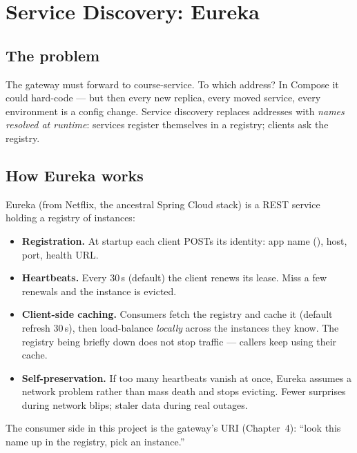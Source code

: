 \chapter{Service Discovery: Eureka}
\label{ch:eureka}

\section{The problem}

The gateway must forward  to course-service. To which
address? In Compose it could hard-code  ---
but then every new replica, every moved service, every environment is a
config change. Service discovery replaces addresses with \emph{names
resolved at runtime}: services register themselves in a registry; clients
ask the registry.

\section{How Eureka works}

Eureka (from Netflix, the ancestral Spring Cloud stack) is a REST service
holding a registry of instances:

\begin{itemize}
  \item \textbf{Registration.} At startup each client POSTs its identity:
  app name (), host, port, health URL.
  \item \textbf{Heartbeats.} Every 30\,s (default) the client renews its
  lease. Miss a few renewals and the instance is evicted.
  \item \textbf{Client-side caching.} Consumers fetch the registry and
  cache it (default refresh 30\,s), then load-balance \emph{locally}
  across the instances they know. The registry being briefly down does
  not stop traffic --- callers keep using their cache.
  \item \textbf{Self-preservation.} If too many heartbeats vanish at once,
  Eureka assumes a network problem rather than mass death and stops
  evicting. Fewer surprises during network blips; staler data during real
  outages.
\end{itemize}

The consumer side in this project is the gateway's 
URI (Chapter~4): ``look this name up in the registry, pick an instance.''

